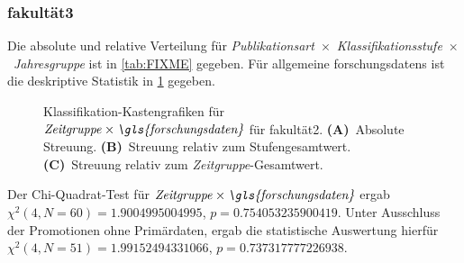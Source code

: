 \subsubsection{\gls{fakultät3}}
Die absolute und relative Verteilung für {\textit{Publikationsart}}~$\times$~{\textit{Klassifikationsstufe}}~$\times$~\textit{Jahresgruppe} ist in \cref{tab:FIXME} gegeben.
Für allgemeine \glspl{forschungsdaten} ist die deskriptive Statistik in \cref{fig:faculty_b_sampled_evaluated_adjusted_factors-only_Zeitgruppe_x_FD_absolute_boxplot} gegeben.
\begin{figure}[!htbp]
    \centering%
    \resizebox{.33\textwidth}{!}{}%
    \resizebox{.33\textwidth}{!}{}%
    \resizebox{.33\textwidth}{!}{}%
    \caption{Klassifikation-Kastengrafiken für $\text{\textit{Zeitgruppe}}\times\text{\textit{\gls{forschungsdaten}}}$ für \gls{fakultät2}. \textbf{(A)}~Absolute Streuung. \textbf{(B)}~Streuung relativ zum Stufengesamtwert. \textbf{(C)}~Streuung relativ zum \textit{Zeitgruppe}-Gesamtwert.}
    \label{fig:faculty_b_sampled_evaluated_adjusted_factors-only_Zeitgruppe_x_FD_absolute_boxplot}
\end{figure}
Der Chi-Quadrat-Test für $\text{\textit{Zeitgruppe}}\times\text{\textit{\gls{forschungsdaten}}}$ ergab $\chi^2 (\num{4}, N = \num{60}) = \num[round-mode=places,round-precision=3]{1.9004995004995}$, $p = \num[round-mode=places,round-precision=3]{0.754053235900419}$.
Unter Ausschluss der Promotionen ohne Primärdaten, ergab die statistische Auswertung hierfür $\chi^2 (\num{4}, N = \num{51}) = \num[round-mode=places,round-precision=3]{1.99152494331066}$, $p = \num[round-mode=places,round-precision=3]{0.737317777226938}$.

